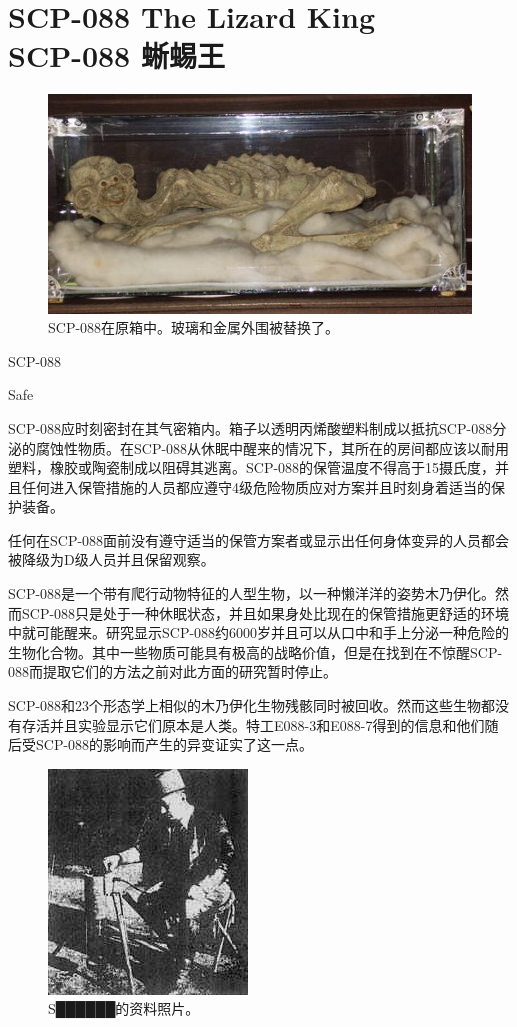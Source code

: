 \chapter[SCP-088 蜥蜴王]{
    SCP-088 The Lizard King\\
    SCP-088 蜥蜴王
}

\label{chap:SCP-088}

\begin{figure}[H]
    \centering
    \includegraphics[width=0.5\linewidth]{images/SCP.088.jpg}
    \caption*{SCP-088在原箱中。玻璃和金属外围被替换了。}
\end{figure}

SCP-088

Safe

SCP-088应时刻密封在其气密箱内。箱子以透明丙烯酸塑料制成以抵抗SCP-088分泌的腐蚀性物质。在SCP-088从休眠中醒来的情况下，其所在的房间都应该以耐用塑料，橡胶或陶瓷制成以阻碍其逃离。SCP-088的保管温度不得高于15摄氏度，并且任何进入保管措施的人员都应遵守4级危险物质应对方案并且时刻身着适当的保护装备。

任何在SCP-088面前没有遵守适当的保管方案者或显示出任何身体变异的人员都会被降级为D级人员并且保留观察。

SCP-088是一个带有爬行动物特征的人型生物，以一种懒洋洋的姿势木乃伊化。然而SCP-088只是处于一种休眠状态，并且如果身处比现在的保管措施更舒适的环境中就可能醒来。研究显示SCP-088约6000岁并且可以从口中和手上分泌一种危险的生物化合物。其中一些物质可能具有极高的战略价值，但是在找到在不惊醒SCP-088而提取它们的方法之前对此方面的研究暂时停止。

SCP-088和23个形态学上相似的木乃伊化生物残骸同时被回收。然而这些生物都没有存活并且实验显示它们原本是人类。特工E088-3和E088-7得到的信息和他们随后受SCP-088的影响而产生的异变证实了这一点。

\begin{figure}[H]
    \centering
    \includegraphics[width=0.5\linewidth]{images/SCP.088.2.jpg}
    \caption*{S██████的资料照片。}
\end{figure}

